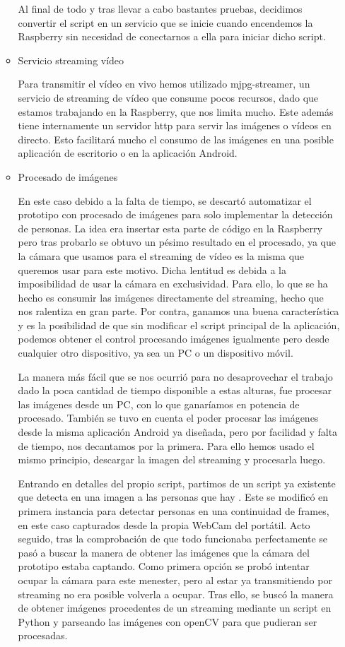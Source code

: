 \documentclass{pclass}
\begin{document}
\begin{itemize}
\begin{itemize}
	Al final de todo y tras llevar a cabo bastantes pruebas, decidimos convertir el script en un servicio que se inicie cuando encendemos la Raspberry sin necesidad de conectarnos a ella para iniciar dicho script.	\cite{servicio}
	

	
	\item Servicio streaming vídeo
	
	Para transmitir el vídeo en vivo hemos utilizado mjpg-streamer, un servicio de streaming de vídeo que consume pocos recursos, dado que estamos trabajando en la Raspberry, que nos limita mucho. Este además tiene internamente un servidor http para servir las imágenes o vídeos en directo. Esto facilitará mucho el consumo de las imágenes en una posible aplicación de escritorio o en la aplicación Android.
	
	
	
	\item Procesado de imágenes
	
		En este caso debido a la falta de tiempo, se descartó automatizar el prototipo con procesado de imágenes para solo implementar la detección de personas. La idea era insertar esta parte de código en la Raspberry pero tras probarlo se obtuvo un pésimo resultado en el procesado, ya que la cámara que usamos para el streaming de vídeo es la misma que queremos usar para este motivo. Dicha lentitud es debida a la imposibilidad de usar la cámara en exclusividad. Para ello, lo que se ha hecho es consumir las imágenes directamente del streaming, hecho que nos ralentiza en gran parte. Por contra, ganamos una buena característica y es la posibilidad de que sin modificar el script principal de la aplicación, podemos obtener el control procesando imágenes igualmente pero desde cualquier otro dispositivo, ya sea un PC o un dispositivo móvil.
		
		La manera más fácil que se nos ocurrió para no desaprovechar el trabajo dado la poca cantidad de tiempo disponible a estas alturas, fue procesar las imágenes desde un PC, con lo que ganaríamos en potencia de procesado. También se tuvo en cuenta el poder procesar las imágenes desde la misma aplicación Android ya diseñada, pero por facilidad y falta de tiempo, nos decantamos por la primera. Para ello hemos usado el mismo principio, descargar la imagen del streaming y procesarla luego. 
		
		Entrando en detalles del propio script, partimos de un script ya existente que detecta en una imagen a las personas que hay \cite{pedestrian}. Este se modificó en primera instancia para detectar personas en una continuidad de frames, en este caso capturados desde la propia WebCam del portátil. Acto seguido, tras la comprobación de que todo funcionaba perfectamente se pasó a buscar la manera de obtener las imágenes que la cámara del prototipo estaba captando. Como primera opción se probó intentar ocupar la cámara para este menester, pero al estar ya transmitiendo por streaming no era posible volverla a ocupar. Tras ello, se buscó la manera de obtener imágenes procedentes de un streaming mediante un script en Python y parseando las imágenes con openCV para que pudieran ser procesadas. \cite{OpenCV}
		

\end{itemize}
\end{itemize}
\end{document}
